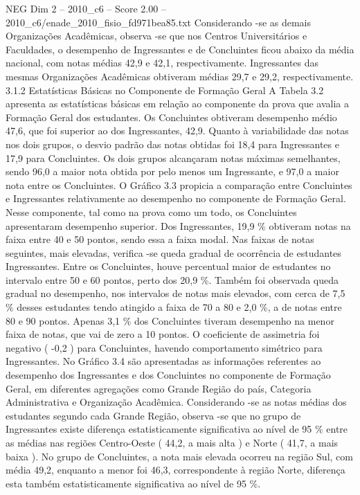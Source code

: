 \begin{textsample}{NEG Dim 2 – 2010\_c6 – Score 2.00 – 2010\_c6/enade\_2010\_fisio\_fd971bea85.txt}
Considerando -se as demais Organizações Acadêmicas, observa -se que nos Centros Universitários e Faculdades, o desempenho de Ingressantes e de Concluintes ficou abaixo da média nacional, com notas médias 42,9 e 42,1, respectivamente.
Ingressantes das mesmas Organizações Acadêmicas obtiveram médias 29,7 e 29,2, respectivamente. 3.1.2 Estatísticas Básicas no Componente de Formação Geral A Tabela 3.2 apresenta as estatísticas básicas em relação ao componente da prova que avalia a Formação Geral dos estudantes.
Os Concluintes obtiveram desempenho médio 47,6, que foi superior ao dos Ingressantes, 42,9.
Quanto à variabilidade das notas nos dois grupos, o desvio padrão das notas obtidas foi 18,4 para Ingressantes e 17,9 para Concluintes.
Os dois grupos alcançaram notas máximas semelhantes, sendo 96,0 a maior nota obtida por pelo menos um Ingressante, e 97,0 a maior nota entre os Concluintes.
O Gráfico 3.3 propicia a comparação entre Concluintes e Ingressantes relativamente ao desempenho no componente de Formação Geral.
Nesse componente, tal como na prova como um todo, os Concluintes apresentaram desempenho superior.
Dos Ingressantes, 19,9 \% obtiveram notas na faixa entre 40 e 50 pontos, sendo essa a faixa modal.
Nas faixas de notas seguintes, mais elevadas, verifica -se queda gradual de ocorrência de estudantes Ingressantes.
Entre os Concluintes, houve percentual maior de estudantes no intervalo entre 50 e 60 pontos, perto dos 20,9 \%.
Também foi observada queda gradual no desempenho, nos intervalos de notas mais elevados, com cerca de 7,5 \% desses estudantes tendo atingido a faixa de 70 a 80 e 2,0 \%, a de notas entre 80 e 90 pontos.
Apenas 3,1 \% dos Concluintes tiveram desempenho na menor faixa de notas, que vai de zero a 10 pontos.
O coeficiente de assimetria foi negativo ( -0,2 ) para Concluintes, havendo comportamento simétrico para Ingressantes.
No Gráfico 3.4 são apresentadas as informações referentes ao desempenho dos Ingressantes e dos Concluintes no componente de Formação Geral, em diferentes agregações como Grande Região do país, Categoria Administrativa e Organização Acadêmica.
Considerando -se as notas médias dos estudantes segundo cada Grande Região, observa -se que no grupo de Ingressantes existe diferença estatisticamente significativa ao nível de 95 \% entre as médias nas regiões Centro-Oeste ( 44,2, a mais alta ) e Norte ( 41,7, a mais baixa ).
No grupo de Concluintes, a nota mais elevada ocorreu na região Sul, com média 49,2, enquanto a menor foi 46,3, correspondente à região Norte, diferença esta também estatisticamente significativa ao nível de 95 \%.

\end{textsample}
